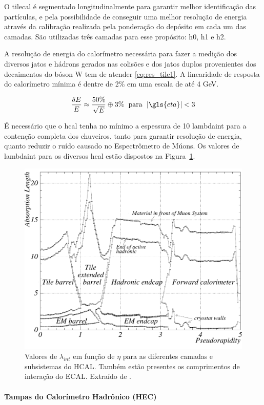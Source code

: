 O \gls{tilecal} é segmentado longitudinalmente para garantir melhor identificação
das partículas, e pela possibilidade de conseguir uma melhor resolução de
energia através da calibração realizada pela ponderação do depósito em cada um
das camadas. São utilizadas três camadas para esse propósito: \gls{h0}, \gls{h1} 
e \gls{h2}.

A resolução de energia do calorímetro necessária para fazer a medição dos
diversos jatos e hádrons gerados nas colisões e dos jatos duplos provenientes 
dos decaimentos do bóson W tem de atender \ref{eq:res_tile1}. 
A linearidade de resposta do calorímetro mínima é dentre de 2\% em uma escala de até 4
GeV.

\begin{equation}\label{eq:res_tile1}
\frac{\delta E}{E} \approx \frac{50\%}{\sqrt{E}} \oplus 3\% \;\ \text{para} \;\
|\gls{eta}|<3
\end{equation}

É necessário que o \gls{hcal} tenha no mínimo a espessura de 10 \gls{lambdaint}
para a contenção completa dos chuveiros, tanto para garantir resolução de
energia, quanto reduzir o ruído causado no Espectrômetro de Múons. Os valores de
\gls{lambdaint} para os diversos \gls{hcal} estão dispostos na
Figura~\ref{fig:cal_had_lambda}.

\begin{figure}[h!t]
\centering
\includegraphics[width=.6\textwidth]{imagens/cal_had_lambda.pdf}
\caption[Valores de $\lambda_{int}$ em função de $\eta$ para as diferentes
camadas e subsistemas do calorímetro]{
Valores de $\lambda_{int}$ em função de $\eta$ para as diferentes
camadas e subsistemas do HCAL. Também estão presentes os comprimentos de interação do ECAL. 
Extraído de \cite{cal_tdr}.}
\label{fig:cal_had_lambda}
\end{figure}


\paragraph{Tampas do Calorímetro Hadrônico (HEC)}
\label{par:cal_hec}

